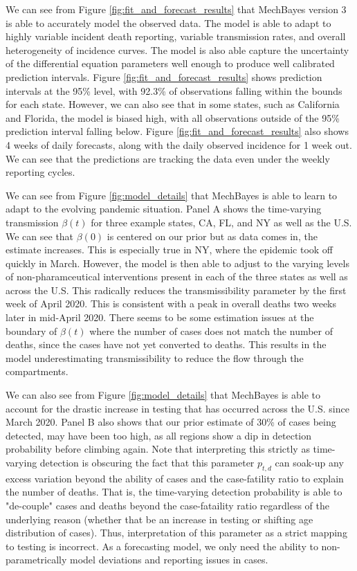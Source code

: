 \documentclass[11pt]{amsart}
\begin{document}
We can see from Figure \ref{fig:fit_and_forecast_results} that MechBayes version 3 is able to accurately model the observed data. The model is able to adapt to highly variable incident death reporting, variable transmission rates, and overall heterogeneity of incidence curves. The model is also able capture the uncertainty of the differential equation parameters well enough to produce well calibrated prediction intervals. Figure \ref{fig:fit_and_forecast_results}  shows prediction intervals at the 95\% level, with 92.3\% of observations falling within the bounds for each state. However, we can also see that in some states, such as California and Florida, the model is biased high, with all observations outside of the 95\% prediction interval falling below. Figure \ref{fig:fit_and_forecast_results}  also shows 4 weeks of daily forecasts, along with the daily observed incidence for 1 week out. We can see that the predictions are tracking the data even under the weekly reporting cycles. 

We can see from Figure \ref{fig:model_details} that MechBayes is able to learn to adapt to the evolving pandemic situation. Panel A shows the time-varying transmission $\beta(t)$ for three example states, CA, FL, and NY as well as the U.S. We can see that $\beta(0)$ is centered on our prior but as data comes in, the estimate increases. This is especially true in NY, where the epidemic took off quickly in March. However, the model is then able to adjust to the varying levels of non-pharamceutical interventions present in each of the three states as well as across the U.S. This radically reduces the transmissibility parameter by the first week of April 2020. This is consistent with a peak in overall deaths two weeks later in mid-April 2020. There seems to be some estimation issues at the boundary of $\beta(t)$ where the number of cases does not match the number of deaths, since the cases have not yet converted to deaths. This results in the model underestimating transmissibility to reduce the flow through the compartments. 

We can also see from Figure \ref{fig:model_details}  that MechBayes is able to account for the drastic increase in testing that has occurred across the U.S. since March 2020. Panel B also shows that our prior estimate of 30\% of cases being detected, may have been too high, as all regions show a dip in detection probability before climbing again. Note that interpreting this strictly as time-varying detection is obscuring the fact that this parameter $p_{t,d}$ can soak-up any excess variation beyond the ability of cases and the case-fatility ratio to explain the number of deaths. That is, the time-varying detection probability is able to "de-couple" cases and deaths beyond the case-fataility ratio regardless of the underlying reason (whether that be an increase in testing or shifting age distribution of cases). Thus, interpretation of this parameter as a strict mapping to testing is incorrect. As a forecasting model, we only need the ability to non-parametrically model deviations and reporting issues in cases.
\end{document}

